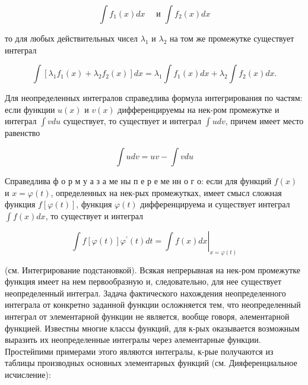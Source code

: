 \documentclass[10pt]{article}
\begin{document}
\[

\int f_{1}(x) d x \quad \text { и } \int f_{2}(x) d x

\]



то для любых действительных чисел $\lambda_{1}$ и $\lambda_{2}$ на том же промежутке существует интеграл



\[

\int\left[\lambda_{1} f_{1}(x)+\lambda_{2} f_{2}(x)\right] d x=\lambda_{1} \int f_{1}(x) d x+\lambda_{2} \int f_{2}(x) d x .

\]



Для неопределенных интегралов справедлива формула интегрирования по частям: если функции $u(x)$ и $v(x)$ дифференцируемы на нек-ром промежутке и интеграл $\int v d u$ существует, то существует и интеграл $\int u d v$, причем имеет место равенство



\[

\int u d v=u v-\int v d u

\]



Справедлива ф о р м у а з а ме ны п е р е ме нн о г о: если для функций $f(x)$ и $x=\varphi(t)$, определенных на нек-рых промежутках, имеет смысл сложная функция $f[\varphi(t)]$, функция $\varphi(t)$ дифференцируема и существует интеграл $\int f(x) d x$, то существует и интеграл



\[

\int f[\varphi(t)] \varphi^{\prime}(t) d t=\left.\int f(x) d x\right|_{x=\varphi(t)}

\]



(см. Интегрирование подстановкой). Всякая непрерывная на нек-ром промежутке функция имеет на нем первообразную и, следовательно, для нее существует неопределенный интеграл. Задача фактического нахождения неопределенного интеграла от конкретно заданной функции осложняется тем, что неопределенный интеграл от элементарной функции не является, вообще говоря, әлементарной функцией. Известны многие классы функций, для к-рых оказывается возможным выразить их неопределенные интегралы через әлементарные функции. Простейпими примерами этого являются интегралы, к-рые получаются из таблицы производных основных элементарных функций (см. Дияференциальное исчисление):
\end{document}
